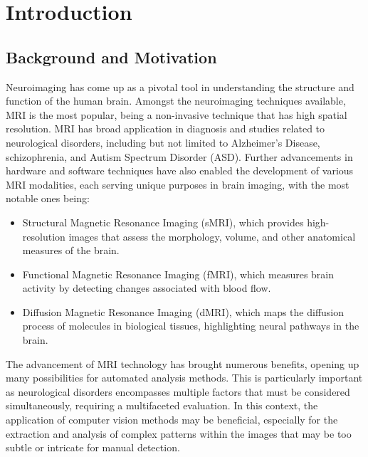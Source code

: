 \chapter{Introduction}

\section{Background and Motivation}
Neuroimaging has come up as a pivotal tool in understanding the structure and
function of the human brain. Amongst the neuroimaging techniques available, MRI
is the most popular, being a non-invasive technique that has high spatial
resolution. MRI has broad application in diagnosis and studies related to
neurological disorders, including but not limited to Alzheimer's Disease,
schizophrenia, and Autism Spectrum Disorder (ASD). Further advancements in
hardware and software techniques have also enabled the development of various
MRI modalities, each serving unique purposes in brain imaging, with the most
notable ones being:
\begin{itemize}
    \item Structural Magnetic Resonance Imaging (sMRI), which provides
    high-resolution images that assess the morphology, volume, and other
    anatomical measures of the brain.
    \item Functional Magnetic Resonance Imaging (fMRI), which measures brain
    activity by detecting changes associated with blood flow.
    \item Diffusion Magnetic Resonance Imaging (dMRI), which maps the diffusion
    process of molecules in biological tissues, highlighting neural pathways in
    the brain.
\end{itemize}
The advancement of MRI technology has brought numerous benefits, opening up many
possibilities for automated analysis methods. This is particularly important as
neurological disorders encompasses multiple factors that must be considered
simultaneously, requiring a multifaceted evaluation. In this context, the
application of computer vision methods may be beneficial, especially for the
extraction and analysis of complex patterns within the images that may be too
subtle or intricate for manual detection.

